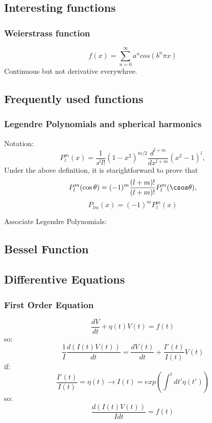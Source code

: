 \subsection{Interesting functions}
\subsubsection{Weierstrass function}
\begin{equation}
    f(x) = \sum_{n=0}^{\infty}a^{n}cos(b^{n}\pi x)
\end{equation}
Continuous but not derivative everywhree.


\subsection{Frequently used functions}

\subsubsection{Legendre Polynomials and spherical harmonics}

Notation:
\[
    P^m_l(x)=\frac{1}{s^ll!}(1-x^2)^{m/2}\frac{d^{l+m}}{dx^{l+m}}(x^2-1)^l,
\]
Under the above definition, it is starightforward to prove that
\[
    P^m_l(\cos\theta)=(-1)^m\frac{(l+m)!}{(l+m)!}P^m_l(\csos\theta),
\]
\[ P_{lm}(x) = (-1)^{m}P_{l}^{m}(x) \]

Associate Legendre Polynomials:

\subsection{Bessel Function}
\subsection{Differentive Equations}

\subsubsection{First Order Equation}
\[ 
\frac{dV}{dt} + \eta(t)V(t) = f(t)  
\]
so:
\[
    \frac{1}{I}\frac{d(I(t)V(t))}{dt} = \frac{dV(t)}{dt} + \frac{I'(t)}{I(t)}V(t)
    \]
if: 
\[ 
    \frac{I'(t)}{I(t)} = \eta(t)	\rightarrow I(t) = exp(\int^{t}dt'\eta(t'))
    \]
so:
\[ \frac{d(I(t)V(t))}{I dt} = f(t)\]


